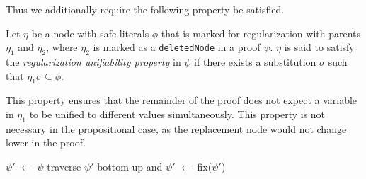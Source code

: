 
\noindent
Thus we additionally require the following property be satisfied.
\begin{definition}
\label{prop:extracheck}
Let $\eta$ be a node with safe literals $\phi$ that is marked for regularization with parents $\eta_1$ and $\eta_2$, where 
$\eta_2$ is marked as a \texttt{deletedNode}
in a proof $\psi$. $\eta$ is said to satisfy the \emph{regularization unifiability property} in $\psi$ if there exists a substitution $\sigma$ such that $\eta_1\sigma \subseteq \phi$.
\end{definition}
This property ensures that the remainder of the proof does not expect a variable in $\eta_1$ to be unified to different values simultaneously. This property is not necessary in the propositional case, as the replacement node would not change lower in the proof. 




\newcommand{\la}{\leftarrow}
\begin{algorithm}[bt]
\begin{footnotesize}


\BlankLine

$\psi'$ $\la$ $\psi$\;
traverse $\psi'$ bottom-up and 
$\psi'$ $\la$ fix($\psi'$) \;
\;
\caption{\label{algo:FORPI} \texttt{\FORPI}}
\end{footnotesize}
\end{algorithm}


